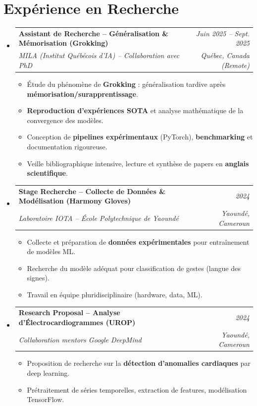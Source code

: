 \documentclass[a4paper,11pt]{article}
\makeatletter
\newcommand{\resumeSubheading}[4]{
  \vspace{-1pt}\item
    \begin{tabular*}{0.97\textwidth}[t]{l@{\extracolsep{\fill}}r}
      \textbf{#1} & \textit{\small #2} \\
      \textit{\small #3} & \textit{\small #4} \\
    \end{tabular*}\vspace{-5pt}
}
\makeatother
\begin{document}
\section{Expérience en Recherche}
\begin{itemize}[leftmargin=*, label={-}]

    \resumeSubheading
      {Assistant de Recherche -- Généralisation \& Mémorisation (Grokking)}{Juin 2025 -- Sept. 2025}
      {MILA (Institut Québécois d'IA) -- Collaboration avec PhD}{Québec, Canada (Remote)}
      \vspace{3pt}
      \begin{itemize}[leftmargin=0.4cm, nosep, label=\tiny$\bullet$]
        \item \small{Étude du phénomène de \textbf{Grokking} : généralisation tardive après \textbf{mémorisation/surapprentissage}.}
        \item \small{\textbf{Reproduction d'expériences SOTA} et analyse mathématique de la convergence des modèles.}
        \item \small{Conception de \textbf{pipelines expérimentaux} (PyTorch), \textbf{benchmarking} et documentation rigoureuse.}
        \item \small{Veille bibliographique intensive, lecture et synthèse de papers en \textbf{anglais scientifique}.}
      \end{itemize}
    \vspace{2pt}

    \resumeSubheading
      {Stage Recherche -- Collecte de Données \& Modélisation (Harmony Gloves)}{2024}
      {Laboratoire IOTA -- École Polytechnique de Yaoundé}{Yaoundé, Cameroun}
      \vspace{3pt}
      \begin{itemize}[leftmargin=0.4cm, nosep, label=\tiny$\bullet$]
        \item \small{Collecte et préparation de \textbf{données expérimentales} pour entraînement de modèles ML.}
        \item \small{Recherche du modèle adéquat pour classification de gestes (langue des signes).}
        \item \small{Travail en équipe pluridisciplinaire (hardware, data, ML).}
      \end{itemize}
    \vspace{2pt}

    \resumeSubheading
      {Research Proposal -- Analyse d'Électrocardiogrammes (UROP)}{2024}
      {Collaboration mentors Google DeepMind}{Yaoundé, Cameroun}
      \vspace{3pt}
      \begin{itemize}[leftmargin=0.4cm, nosep, label=\tiny$\bullet$]
        \item \small{Proposition de recherche sur la \textbf{détection d'anomalies cardiaques} par deep learning.}
        \item \small{Prétraitement de séries temporelles, extraction de features, modélisation TensorFlow.}
      \end{itemize}

\end{itemize}
\end{document}

